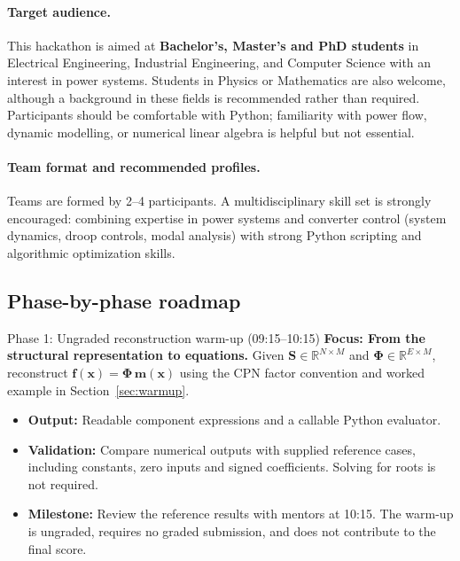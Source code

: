 \documentclass[11pt,a4paper]{article}
\begin{document}
\paragraph{Target audience.}
This hackathon is aimed at \textbf{Bachelor's, Master's and PhD students} in Electrical Engineering, Industrial Engineering, and Computer Science with an interest in power systems. Students in Physics or Mathematics are also welcome, although a background in these fields is recommended rather than required. Participants should be comfortable with Python; familiarity with power flow, dynamic modelling, or numerical linear algebra is helpful but not essential.

\paragraph{Team format and recommended profiles.}
Teams are formed by 2--4 participants. A multidisciplinary skill set is strongly encouraged: combining expertise in power systems and converter control (system dynamics, droop controls, modal analysis) with strong Python scripting and algorithmic optimization skills.

\subsection{Phase-by-phase roadmap}

\begin{challengebox}{Phase 1: Ungraded reconstruction warm-up (09:15--10:15)}
  \textbf{Focus: From the structural representation to equations.} Given
  $\mathbf{S}\in\mathbb{R}^{N\times M}$ and $\boldsymbol{\Phi}\in\mathbb{R}^{E\times M}$, reconstruct
  $\mathbf f(\mathbf x)=\boldsymbol{\Phi}\,\mathbf m(\mathbf x)$ using the CPN factor convention
  and worked example in Section~\ref{sec:warmup}.
  \begin{itemize}[leftmargin=*, itemsep=1pt]
    \item \textbf{Output:} Readable component expressions and a callable Python evaluator.
    \item \textbf{Validation:} Compare numerical outputs with supplied reference cases,
    including constants, zero inputs and signed coefficients. Solving for roots is not required.
    \item \textbf{Milestone:} Review the reference results with mentors at 10:15.
    The warm-up is ungraded, requires no graded submission, and does not
    contribute to the final score.
  \end{itemize}
\end{challengebox}
\end{document}
